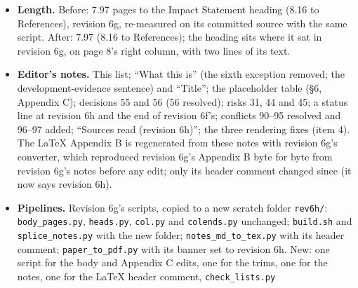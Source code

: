 \documentclass{article}
\theoremstyle{plain}
\theoremstyle{definition}
\theoremstyle{remark}
\begin{document}
\begin{itemize}
        removes a reason from the body); ``per arm and scorer'' (\S{}4.7), the
        merged ``we report'' sentence (\S{}6, ``Scope and user''),
        ``attack-success rates under other judges'', ``are not tested'' and
        ``compared at equal budgets;'' (none saves a line); (1) without its
        second and third changes, and (2) or (3) alone (no line saved); and
        three other wordings of the sentence: ``\ldots{}; A1's rank under
        disjoint-source anchors is the planned check (Appendix C.5)'' (no fit
        with the four trims), ``The plant and A1's anchors share their PKU
        source; \ldots{}'' and ``The plant shares A1's anchor source,
        PKU-SafeRLHF; a disjoint-anchor rank \ldots{}'' (both fit without trim
        (4); the kept wording names the source as Appendix C.5 does and follows
        the ruling's words).
  \item \textbf{Length.} Before: 7.97 pages to the Impact Statement heading
        (8.16 to References), revision 6g, re-measured on its committed source
        with the same script. After: 7.97 (8.16 to References); the heading sits
        where it sat in revision 6g, on page 8's right column, with two lines of
        its text.
  \item \textbf{Editor's notes.} This list; ``What this is'' (the sixth
        exception removed; the development-evidence sentence) and ``Title''; the
        placeholder table (\S{}6, Appendix C); decisions 55 and 56 (56
        resolved); risks 31, 44 and 45; a status line at revision 6h and the end
        of revision 6f's; conflicts 90--95 resolved and 96--97 added; ``Sources
        read (revision 6h)''; the three rendering fixes (item 4). The LaTeX
        Appendix B is regenerated from these notes with revision 6g's converter,
        which reproduced revision 6g's Appendix B byte for byte from revision
        6g's notes before any edit; only its header comment changed since (it
        now says revision 6h).
  \item \textbf{Pipelines.} Revision 6g's scripts, copied to a new scratch
        folder \nolinkurl{rev6h/}: \nolinkurl{body_pages.py},
        \nolinkurl{heads.py}, \nolinkurl{col.py} and \nolinkurl{colends.py}
        unchanged; \nolinkurl{build.sh} and \nolinkurl{splice_notes.py} with the
        new folder; \nolinkurl{notes_md_to_tex.py} with its header comment;
        \nolinkurl{paper_to_pdf.py} with its banner set to revision 6h. New: one
        script for the body and Appendix C edits, one for the trims, one for the
        notes, one for the LaTeX header comment, \nolinkurl{check_lists.py}

\end{itemize}
\end{document}
